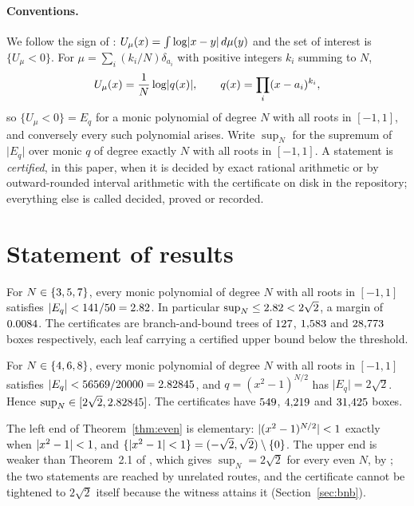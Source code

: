 \documentclass[11pt]{article}
\newcommand{\meas}[1]{\lvert #1 \rvert}
\begin{document}
\paragraph{Conventions.}
We follow the sign of \cite{Tao179}: $U_\mu(x)=\int\log\lvert x-y \rvert\,d\mu(y)$ and the set of
interest is $\{U_\mu<0\}$. For $\mu=\sum_i(k_i/N)\delta_{a_i}$ with positive integers $k_i$
summing to $N$,
\[
U_\mu(x)=\frac1N\log\lvert q(x) \rvert,\qquad q(x)=\prod_i(x-a_i)^{k_i},
\]
so $\{U_\mu<0\}=E_q$ for a monic polynomial of degree $N$ with all roots in $[-1,1]$, and
conversely every such polynomial arises. Write $\sup_N$ for the supremum of $\meas{E_q}$ over
monic $q$ of degree exactly $N$ with all roots in $[-1,1]$. A statement is \emph{certified},
in this paper, when it is decided by exact rational arithmetic or by outward-rounded interval
arithmetic with the certificate on disk in the repository; everything else is called decided,
proved or recorded.

\section{Statement of results}

\begin{theorem}\label{thm:odd}
For $N\in\{3, 5, 7\}$, every monic polynomial of degree $N$ with all roots in $[-1,1]$
satisfies $\meas{E_q}<\TOddFrac=\TOdd$. In particular $\sup_N\le2.82<2\sqrt2$, a margin of
$0.0084$. The certificates are branch-and-bound trees of $127$, $1{,}583$ and
$28{,}773$ boxes respectively, each leaf carrying a certified upper bound below the threshold.
\end{theorem}

\begin{theorem}\label{thm:even}
For $N\in\{4, 6, 8\}$, every monic polynomial of degree $N$ with all roots in $[-1,1]$
satisfies $\meas{E_q}<\TEvenFrac=\TEven$, and $q=(x^2-1)^{N/2}$ has $\meas{E_q}=2\sqrt2$.
Hence $\sup_N\in[2\sqrt2,2.82845]$. The certificates have $549$, $4{,}219$ and
$31{,}425$ boxes.
\end{theorem}

The left end of Theorem~\ref{thm:even} is elementary: $\lvert (x^2-1)^{N/2} \rvert<1$ exactly when
$\lvert x^2-1 \rvert<1$, and $\{\lvert x^2-1 \rvert<1\}=(-\sqrt2,\sqrt2)\setminus\{0\}$. The upper end is
weaker than Theorem~2.1 of \cite{TaoNotes}, which gives $\sup_N=2\sqrt2$ for every even $N$,
by \SlackEven; the two statements are reached by unrelated routes, and the certificate
cannot be tightened to $2\sqrt2$ itself because the witness attains it (Section~\ref{sec:bnb}).
\end{document}

